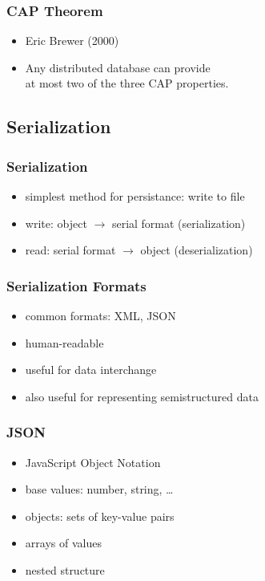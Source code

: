 \documentclass[dvipsnames]{beamer}
\theoremstyle{plain}
\begin{document}
\begin{frame}
  \frametitle{CAP Theorem}

  \begin{itemize}
    \item Eric Brewer (2000)
    \item Any distributed database can provide\\
      at most two of the three CAP properties.
  \end{itemize}
\end{frame}

\subsection{Serialization}

\begin{frame}
  \frametitle{Serialization}

  \begin{itemize}
    \item simplest method for persistance: write to file

    \medskip
    \item write: object $\rightarrow$ serial format (\alert{serialization})
    \item read: serial format $\rightarrow$ object (\alert{deserialization})
  \end{itemize}
\end{frame}

\begin{frame}
  \frametitle{Serialization Formats}

  \begin{itemize}
    \item common formats: XML, JSON
    \item human-readable
    \item useful for data interchange
    \item also useful for representing semistructured data
  \end{itemize}
\end{frame}

\begin{frame}
  \frametitle{JSON}

  \begin{itemize}
    \item JavaScript Object Notation

    \medskip
    \item base values: number, string, \ldots
    \item objects: sets of key-value pairs
    \item arrays of values

    \medskip
    \item nested structure
  \end{itemize}
\end{frame}
\end{document}
